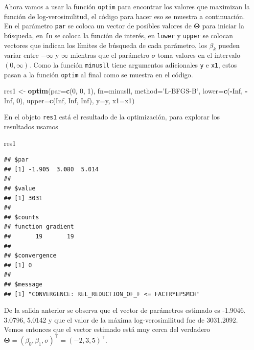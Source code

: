 \documentclass[10pt,]{krantz}
\makeatletter
\newenvironment{Shaded}{\begin{snugshade}}{\end{snugshade}}
\newcommand{\KeywordTok}[1]{\textcolor[rgb]{0.13,0.29,0.53}{\textbf{#1}}}
\newcommand{\DataTypeTok}[1]{\textcolor[rgb]{0.13,0.29,0.53}{#1}}
\newcommand{\DecValTok}[1]{\textcolor[rgb]{0.00,0.00,0.81}{#1}}
\newcommand{\StringTok}[1]{\textcolor[rgb]{0.31,0.60,0.02}{#1}}
\newcommand{\OtherTok}[1]{\textcolor[rgb]{0.56,0.35,0.01}{#1}}
\newcommand{\OperatorTok}[1]{\textcolor[rgb]{0.81,0.36,0.00}{\textbf{#1}}}
\newcommand{\NormalTok}[1]{#1}
\newenvironment{kframe}{%
\medskip{}
\setlength{\fboxsep}{.8em}
 \def\at@end@of@kframe{}%
 \ifinner\ifhmode%
  \def\at@end@of@kframe{\end{minipage}}%
  \begin{minipage}{\columnwidth}%
 \fi\fi%
 \def\FrameCommand##1{\hskip\@totalleftmargin \hskip-\fboxsep
 \colorbox{shadecolor}{##1}\hskip-\fboxsep
     \hskip-\linewidth \hskip-\@totalleftmargin \hskip\columnwidth}%
 \MakeFramed {\advance\hsize-\width
   \@totalleftmargin\z@ \linewidth\hsize
   \@setminipage}}%
 {\par\unskip\endMakeFramed%
 \at@end@of@kframe}
\renewenvironment{Shaded}{\begin{kframe}}{\end{kframe}}
\makeatother
\begin{document}
Ahora vamos a usar la función \texttt{optim} para encontrar los valores
que maximizan la función de log-verosimilitud, el código para hacer eso
se muestra a continuación. En el parámetro \texttt{par} se coloca un
vector de posibles valores de \(\boldsymbol{\Theta}\) para iniciar la
búsqueda, en \texttt{fn} se coloca la función de interés, en
\texttt{lower} y \texttt{upper} se colocan vectores que indican los
límites de búsqueda de cada parámetro, los \(\beta_k\) pueden variar
entre \(-\infty\) y \(\infty\) mientras que el parámetro \(\sigma\) toma
valores en el intervalo \((0, \infty)\). Como la función
\texttt{minusll} tiene argumentos adicionales \texttt{y} e \texttt{x1},
estos pasan a la función \texttt{optim} al final como se muestra en el
código.

\begin{Shaded}
\begin{Highlighting}[]
\NormalTok{res1 <-}\StringTok{ }\KeywordTok{optim}\NormalTok{(}\DataTypeTok{par=}\KeywordTok{c}\NormalTok{(}\DecValTok{0}\NormalTok{, }\DecValTok{0}\NormalTok{, }\DecValTok{1}\NormalTok{), }\DataTypeTok{fn=}\NormalTok{minusll,}
              \DataTypeTok{method=}\StringTok{'L-BFGS-B'}\NormalTok{,}
              \DataTypeTok{lower=}\KeywordTok{c}\NormalTok{(}\OperatorTok{-}\OtherTok{Inf}\NormalTok{, }\OperatorTok{-}\OtherTok{Inf}\NormalTok{, }\DecValTok{0}\NormalTok{),}
              \DataTypeTok{upper=}\KeywordTok{c}\NormalTok{(}\OtherTok{Inf}\NormalTok{, }\OtherTok{Inf}\NormalTok{, }\OtherTok{Inf}\NormalTok{), }\DataTypeTok{y=}\NormalTok{y, }\DataTypeTok{x1=}\NormalTok{x1)}
\end{Highlighting}
\end{Shaded}

En el objeto \texttt{res1} está el resultado de la optimización, para
explorar los resultados usamos

\begin{Shaded}
\begin{Highlighting}[]
\NormalTok{res1}
\end{Highlighting}
\end{Shaded}

\begin{verbatim}
## $par
## [1] -1.905  3.080  5.014
## 
## $value
## [1] 3031
## 
## $counts
## function gradient 
##       19       19 
## 
## $convergence
## [1] 0
## 
## $message
## [1] "CONVERGENCE: REL_REDUCTION_OF_F <= FACTR*EPSMCH"
\end{verbatim}

De la salida anterior se observa que el vector de parámetros estimado es
-1.9046, 3.0796, 5.0142 y que el valor de la máxima log-verosimilitud
fue de 3031.2092. Vemos entonces que el vector estimado está muy cerca
del verdadero
\(\boldsymbol{\Theta}=(\beta_0, \beta_1, \sigma)^\top=(-2, 3, 5)^\top\).
\end{document}
